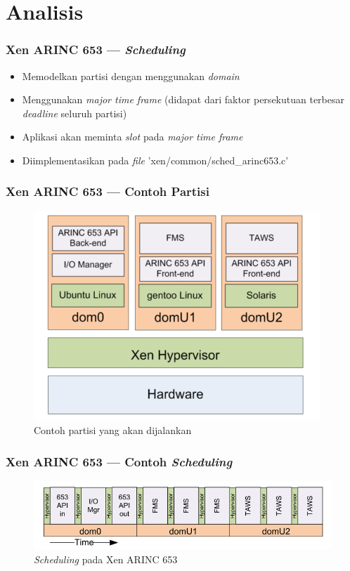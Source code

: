 \documentclass[xetex]{beamer}
\begin{document}
    \section{Analisis}
    \begin{frame}
        \frametitle{Xen ARINC 653 --- \textit{Scheduling}}
        \begin{itemize}
            \item Memodelkan partisi dengan menggunakan \textit{domain}
            \item Menggunakan \textit{major time frame} (didapat dari faktor persekutuan terbesar \textit{deadline} seluruh partisi)
            \item Aplikasi akan meminta \textit{slot} pada \textit{major time frame}
            \item Diimplementasikan pada \textit{file} 'xen/common/sched\_arinc653.c'
        \end{itemize}
    \end{frame}
    \begin{frame}
        \frametitle{Xen ARINC 653 --- Contoh Partisi}
        \begin{figure}[htbp]
            \includegraphics[scale=0.4]{resources/xen-arinc653-partitions.png}
            \caption*{Contoh partisi yang akan dijalankan}
        \end{figure}
    \end{frame}
    \begin{frame}
        \frametitle{Xen ARINC 653 --- Contoh \textit{Scheduling}}
        \begin{figure}[htbp]
            \includegraphics[scale=0.4]{resources/xen-arinc653-partition-schedule.png}
            \caption*{\textit{Scheduling} pada Xen ARINC 653}
        \end{figure}
    \end{frame}
\end{document}
